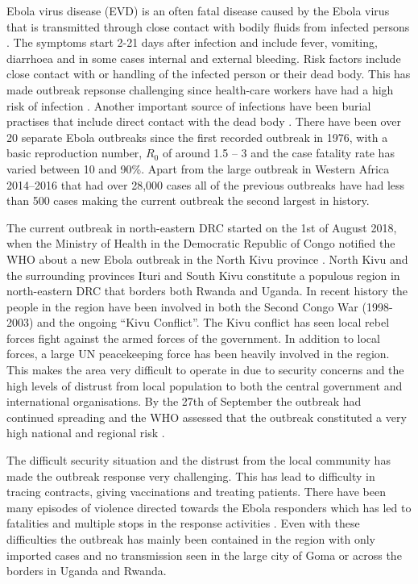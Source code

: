 \documentclass[12pt]{article}
\begin{document}
Ebola virus disease (EVD) is an often fatal disease caused by the Ebola virus that is transmitted through close contact with bodily fluids from infected persons \cite{worldhealthorganisationEbolaVirusDisease}. The symptoms start 2-21 days after infection and include fever, vomiting, diarrhoea and in some cases internal and external bleeding.  Risk factors include close contact with or handling of the infected person or their dead body. This has made outbreak repsonse challenging since health-care workers have had a high risk of infection \cite{brainardRiskFactorsTransmission2016}. Another important source of infections have been burial practises that include direct contact with the dead body \cite{brainardRiskFactorsTransmission2016}. There have been over 20 separate Ebola outbreaks since the first recorded outbreak in 1976, with a basic reproduction number, $R_0$ of around 1.5 -- 3 \cite{whoebolaresponseteamEbolaVirusDisease2014,legrandUnderstandingDynamicsEbola2007} and the case fatality rate has varied between 10 and 90\%. Apart from the large outbreak in Western Africa 2014--2016 that had over 28,000 cases all of the previous outbreaks have had less than 500 cases \cite{worldhealthorganisationEbolaVirusDisease} making the current outbreak the second largest in history.

The current outbreak in north-eastern DRC started on the 1st of August 2018, when the Ministry of Health in the Democratic Republic of Congo notified the WHO about a new Ebola outbreak in the North Kivu province \cite{worldhealthorganizationEbolaOutbreakDRC2018a}. North Kivu and the surrounding provinces Ituri and South Kivu constitute a populous region in north-eastern DRC that borders both Rwanda and Uganda. In recent history the people in the region have been involved in both the Second Congo War (1998-2003) and the ongoing ``Kivu Conflict''. The Kivu conflict has seen local rebel forces fight against the armed forces of the government. In addition to local forces, a large UN peacekeeping force has been heavily involved in the region. This makes the area very difficult to operate in due to security concerns and the high levels of distrust from local population to both the central government and international organisations. By the 27th of September the outbreak had continued spreading and the WHO assessed that the outbreak constituted a very high national and regional risk \cite{worldhealthorganizationEbolaOutbreakDRC2018b}.

The difficult security situation and the distrust from the local community has made the outbreak response very challenging. This has lead to difficulty in tracing contracts, giving vaccinations and treating patients. There have been many episodes of violence directed towards the Ebola responders which has led to fatalities and multiple stops in the response activities \cite{worldhealthorganizationEbolaOutbreakDRC2018c,worldhealthorganizationEbolaOutbreakDRC2019a}. Even with these difficulties the outbreak has mainly been contained in the region with only imported cases and no transmission seen in the large city of Goma or across the borders in Uganda and Rwanda. 
\end{document}
